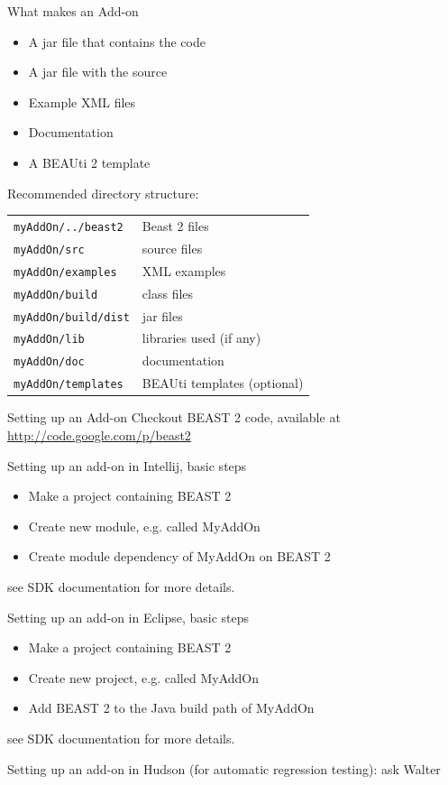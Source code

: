 \documentclass{beamer}
\theoremstyle{definition}
\begin{document}
\begin{frame}{What makes an Add-on}

\begin{itemize}
\item A jar file that contains the code
\item A jar file with the source
\item Example XML files
\item Documentation
\item A BEAUti 2 template
\end{itemize}\vskip0.5cm

Recommended directory structure:\\
\begin{tabular}{ll}
{\color{blue}\tt myAddOn/../beast2} &Beast 2 files\\
{\color{blue}\tt myAddOn/src} &source files\\
{\color{blue}\tt myAddOn/examples} &XML examples\\
{\color{blue}\tt myAddOn/build} &class files\\
{\color{blue}\tt myAddOn/build/dist} &jar files\\
{\color{black}\tt myAddOn/lib} &libraries used (if any)\\
{\color{black}\tt myAddOn/doc} &documentation\\
{\color{black}\tt myAddOn/templates} &BEAUti templates (optional)
\end{tabular}

\end{frame}

\begin{frame}{Setting up an Add-on}
Checkout BEAST 2 code, available at
\url{http://code.google.com/p/beast2}\vskip0.5cm

Setting up an add-on in Intellij, basic steps
\begin{itemize}
\item Make a project containing BEAST 2
\item Create new module, e.g. called MyAddOn
\item Create module dependency of MyAddOn on BEAST 2
\end{itemize}
see SDK documentation for more details.\vskip0.5cm

Setting up an add-on in Eclipse, basic steps
\begin{itemize}
\item Make a project containing BEAST 2
\item Create new project, e.g. called MyAddOn
\item Add BEAST 2 to the Java build path of MyAddOn
\end{itemize}
see SDK documentation for more details.\vskip0.5cm

Setting up an add-on in Hudson (for automatic regression testing): ask Walter
\end{frame}
\end{document}
